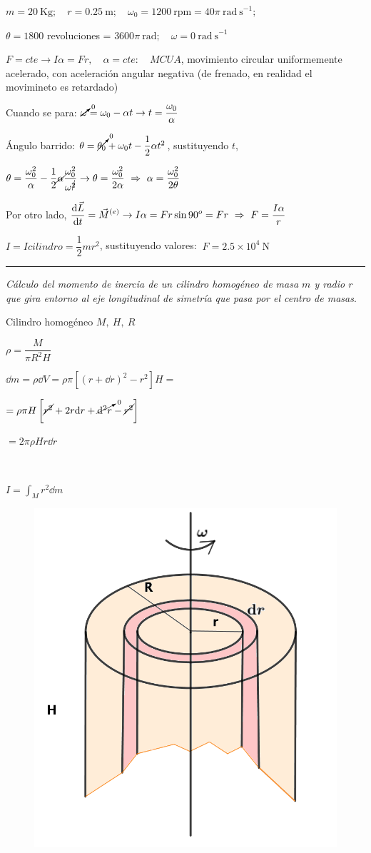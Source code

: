 $m=20 \ \mathrm{Kg}; \quad r=0.25\ \mathrm{m}; \quad \omega_0=1200\ \mathrm{rpm}=40\pi\  \mathrm{rad\ s}^{-1};$

$\theta=1800$ revoluciones = $3600\pi \ \mathrm{rad};\quad \omega=0 \  \mathrm{rad\ s}^{-1}$

$F=cte \to I\alpha=Fr,\quad \alpha=cte:\quad MCUA$, movimiento circular uniformemente acelerado, con aceleración angular negativa (de frenado, en realidad el movimineto es retardado)

Cuando se para: $\cancelto{0}{\omega}=\omega_0-\alpha t \to t=\dfrac{\omega_0} {\alpha}$

Ángulo barrido: $\theta=\cancelto{0}{\theta_0}+\omega_0 t - \dfrac 1 2 \alpha t^2$, sustituyendo ${t}$,

$\theta = \dfrac {\omega_0^2}{\alpha}-\dfrac 1 2 \cancel{\alpha}\dfrac{\omega_0^2}{\omega^{\cancel{2}}} \to \theta=\dfrac{\omega_0^2}{2\alpha} \ \Rightarrow \ \alpha=\dfrac{\omega_0^2}{2\theta}$

Por otro lado, $\displaystyle \dv {\vec L}{t}=\vec M^{(e)} \to I\alpha=Fr\sin 90^o=Fr \ \Rightarrow \ F=\dfrac{I\alpha}{r}$

$I=I{cilindro}=\dfrac 1 2 m r^2$, sustituyendo valores: $\ F=2.5 \times 10^4\ \mathrm{N}$

\rule{5cm}{.4pt}

\emph{Cálculo del momento de inercia de un cilindro homogéneo de masa $m$ y radio $r$ que gira entorno al eje longitudinal de simetría que pasa por el centro de masas}.

\begin{multicols}{2}
Cilindro homogéneo $M,\ H,\ R$

$\rho=\dfrac{M}{\pi R^2 H}$

$\dd m= \rho \dd V =\rho  \pi \left[ (r+\dd r)^2-r^2 \right] H=$

$=\rho \pi H \left[\cancel{r^2}+2r\dd r +\cancelto{0}{\dd^2 r}-\cancel{r^2} \right]$

$=2\pi \rho H r \dd r$

$\quad$

$I=\displaystyle \int_M r^2 \dd m$
\begin{figure}[H]
	\centering
	\includegraphics[width=.45\textwidth]{imagenes/imagenes16/T16IM22.png}
\end{figure}	
\end{multicols}

